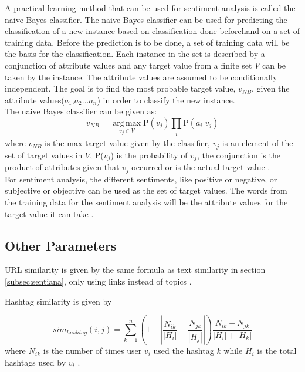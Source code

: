 A practical learning method that can be used for sentiment analysis is called the naive Bayes classifier. The naive Bayes classifier can be used for predicting the classification of a new instance based on classification done beforehand on a set of training data. Before the prediction is to be done, a set of training data will be the basis for the classification. Each instance in the set is described by a conjunction of attribute values and any target value from a finite set $V$ can be taken by the instance. The attribute values are assumed to be conditionally independent. The goal is to find the most probable target value, $v_{NB}$, given the attribute values($a_1$,$a_2$...$a_n$) in order to classify the new instance. \\ The naive Bayes classifier can be given as:
\begin{equation}
v_{NB} = \operatorname*{arg\,max}_{v_j \in V} \text{P}(v_j) \prod_{\substack{i}} \text{P}(a_i|v_j)
\end{equation}
where $v_{NB}$ is the max target value given by the classifier, $v_j$ is an element of the set of target values in $V$, P($v_j$) is the probability of $v_j$, the conjunction is the product of attributes given that $v_j$ occurred or is the actual target value \cite{Mitchell:1997}. \\
For sentiment analysis, the different sentiments, like positive or negative, or subjective or objective can be used as the set of target values. The words from the training data for the sentiment analysis will be the attribute values for the target value it can take \cite{Deitrick:2013}.


\subsection{Other Parameters}


URL similarity is given by the same formula as text similarity in section \ref{subsec:sentiana}, only using links instead of topics \cite{Zhang:2012}.


Hashtag similarity is given by 


\begin{equation}
sim_{hashtag}(i,j) = \sum_{k=1}^n (1 - \left|{\frac{N_{ik}}{\left|{H_i}\right|} - \frac{N_{jk}}{\left|{H_j}\right|}}\right|)\frac{N_{ik} + N_{jk}}{\left|{H_i}\right| + \left|{H_k}\right|}
\end{equation}where $N_{ik}$ is the number of times user $v_i$ used the hashtag $k$ while $H_i$ is the total hashtags used by $v_i$ \cite{Zhang:2012}.


